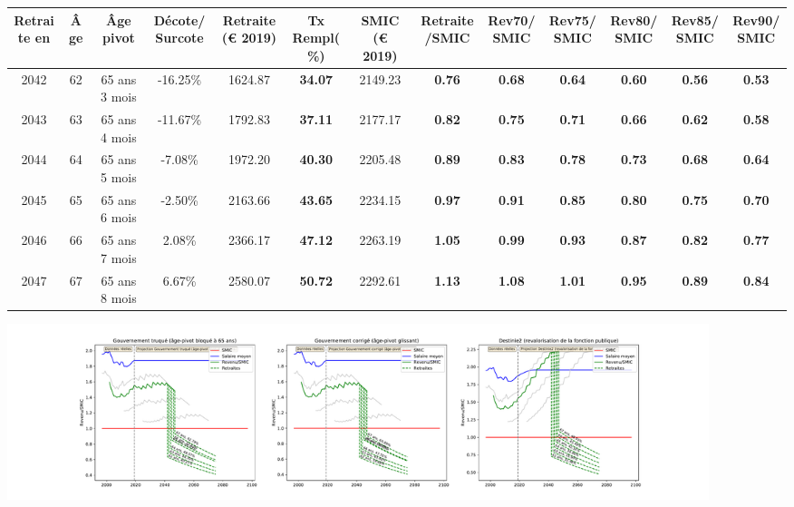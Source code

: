 { \scriptsize \begin{center} 
\begin{tabular}[htb]{|c|c||c|c||c|c||c||c|c|c|c|c|c|} 
\hline 
 Retraite en &  Âge &  Âge pivot &  Décote/Surcote &  Retraite (\euro{} 2019) &  Tx Rempl(\%) &  SMIC (\euro{} 2019) &  Retraite/SMIC &  Rev70/SMIC &  Rev75/SMIC &  Rev80/SMIC &  Rev85/SMIC &  Rev90/SMIC \\ 
\hline \hline 
 2042 &  62 &  65 ans 3 mois &  -16.25\% &  1624.87 &  {\bf 34.07} &  2149.23 &  {\bf {\color{red} 0.76}} &  {\bf {\color{red} 0.68}} &  {\bf {\color{red} 0.64}} &  {\bf {\color{red} 0.60}} &  {\bf {\color{red} 0.56}} &  {\bf {\color{red} 0.53}} \\ 
\hline 
 2043 &  63 &  65 ans 4 mois &  -11.67\% &  1792.83 &  {\bf 37.11} &  2177.17 &  {\bf {\color{red} 0.82}} &  {\bf {\color{red} 0.75}} &  {\bf {\color{red} 0.71}} &  {\bf {\color{red} 0.66}} &  {\bf {\color{red} 0.62}} &  {\bf {\color{red} 0.58}} \\ 
\hline 
 2044 &  64 &  65 ans 5 mois &  -7.08\% &  1972.20 &  {\bf 40.30} &  2205.48 &  {\bf {\color{red} 0.89}} &  {\bf {\color{red} 0.83}} &  {\bf {\color{red} 0.78}} &  {\bf {\color{red} 0.73}} &  {\bf {\color{red} 0.68}} &  {\bf {\color{red} 0.64}} \\ 
\hline 
 2045 &  65 &  65 ans 6 mois &  -2.50\% &  2163.66 &  {\bf 43.65} &  2234.15 &  {\bf {\color{red} 0.97}} &  {\bf {\color{red} 0.91}} &  {\bf {\color{red} 0.85}} &  {\bf {\color{red} 0.80}} &  {\bf {\color{red} 0.75}} &  {\bf {\color{red} 0.70}} \\ 
\hline 
 2046 &  66 &  65 ans 7 mois &  2.08\% &  2366.17 &  {\bf 47.12} &  2263.19 &  {\bf 1.05} &  {\bf {\color{red} 0.99}} &  {\bf {\color{red} 0.93}} &  {\bf {\color{red} 0.87}} &  {\bf {\color{red} 0.82}} &  {\bf {\color{red} 0.77}} \\ 
\hline 
 2047 &  67 &  65 ans 8 mois &  6.67\% &  2580.07 &  {\bf 50.72} &  2292.61 &  {\bf 1.13} &  {\bf 1.08} &  {\bf 1.01} &  {\bf {\color{red} 0.95}} &  {\bf {\color{red} 0.89}} &  {\bf {\color{red} 0.84}} \\ 
\hline 
\hline 
\end{tabular} 
\end{center} } 

 \begin{center}\includegraphics[width=0.9\textwidth]{fig/Redacteur_1980_22_dest_retraite.pdf}\end{center} \label{fig/Redacteur_1980_22_dest_retraite.pdf} 

